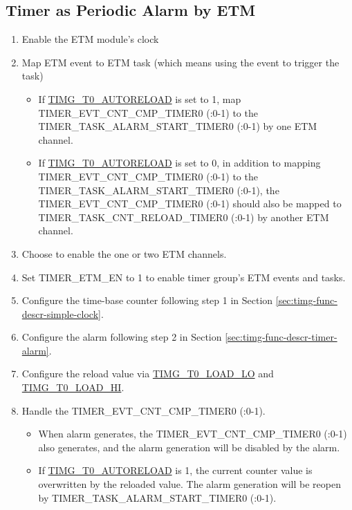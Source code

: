 \documentclass[main\_\_EN.tex]{subfiles}
\begin{document}
\subsection{Timer as Periodic Alarm by ETM} \label{sec:timg-conf-etm}
\begin{enumerate}
    \item Enable the ETM module's clock
    \item Map ETM event to ETM task (which means using the event to trigger the task)
    \begin{itemize}
        \item If \hyperref[fielddesc:TIMGTXAUTORELOAD]{TIMG\_T0\_AUTORELOAD} is set to 1, map TIMER\_EVT\_CNT\_CMP\_TIMER0 (:0-1) to the TIMER\_TASK\_ALARM\_START\_TIMER0 (:0-1) by one ETM channel. 
        \item If \hyperref[fielddesc:TIMGTXAUTORELOAD]{TIMG\_T0\_AUTORELOAD} is set to 0, in addition to mapping TIMER\_EVT\_CNT\_CMP\_TIMER0 (:0-1) to the TIMER\_TASK\_ALARM\_START\_TIMER0 (:0-1), the TIMER\_EVT\_CNT\_CMP\_TIMER0 (:0-1) should also be mapped to TIMER\_TASK\_CNT\_RELOAD\_TIMER0 (:0-1) by another ETM channel.
    \end{itemize}
    \item Choose to enable the one or two ETM channels.
    \item Set TIMER\_ETM\_EN to 1 to enable timer group's ETM events and tasks.
    \item Configure the time-base counter following step 1 in Section \ref{sec:timg-func-descr-simple-clock}.
    \item Configure the alarm following step 2 in Section \ref{sec:timg-func-descr-timer-alarm}.  
    \item Configure the reload value via \hyperref[fielddesc:TIMGTXLOADLO]{TIMG\_T0\_LOAD\_LO} and \hyperref[fielddesc:TIMGTXLOADHI]{TIMG\_T0\_LOAD\_HI}.
    \item Handle the TIMER\_EVT\_CNT\_CMP\_TIMER0 (:0-1).
    \begin{itemize}
        \item When alarm generates, the TIMER\_EVT\_CNT\_CMP\_TIMER0 (:0-1) also generates, and the alarm generation will be disabled by the alarm. 
        \item If \hyperref[fielddesc:TIMGTXAUTORELOAD]{TIMG\_T0\_AUTORELOAD} is 1, the current counter value is overwritten by the reloaded value. The alarm generation will be reopen by TIMER\_TASK\_ALARM\_START\_TIMER0 (:0-1).

\end{itemize}
\end{enumerate}
\end{document}
